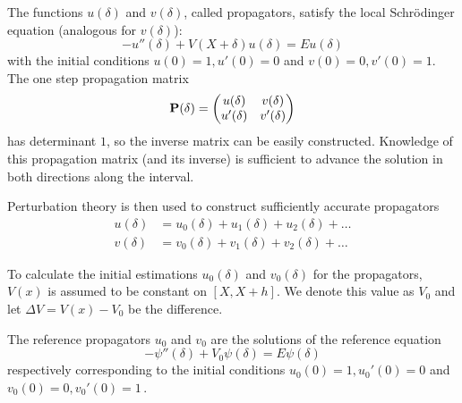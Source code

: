 The functions \(u(\delta)\) and \(v(\delta)\), called propagators,
satisfy the local Schrödinger equation (analogous for \(v(\delta)\)):
\begin{equation}
  - u''(\delta) + V(X+\delta) u(\delta) = E u(\delta) \label{eq:loc}
\end{equation}
with the initial conditions \(u(0) = 1, u'(0)=0\) and
\(v(0) = 0, v'(0)=1\). The one step propagation matrix \[
  \vb{P}(\delta) = \begin{pmatrix} u(\delta) & v(\delta) \\ u'(\delta) & v'(\delta) \end{pmatrix}
\] has determinant \(1\), so the inverse matrix can be easily
constructed. Knowledge of this propagation matrix (and its inverse) is sufficient to
advance the solution in both directions along the interval.

Perturbation theory is then used to construct sufficiently accurate propagators
\begin{align*}
  u(\delta) & = u_0(\delta) + u_1(\delta) + u_2(\delta) + \dots \\
  v(\delta) & = v_0(\delta) + v_1(\delta) + v_2(\delta) + \dots
\end{align*}


To calculate the initial estimations $u_0(\delta)$ and $v_0(\delta)$ for
the propagators, \(V(x)\) is assumed to be constant on \([X, X+h]\).
We denote this value as \(V_0\) and let \(\Delta V = V(x) - V_0\) be the difference.


The reference propagators \(u_0\) and \(v_0\) are the solutions of the reference equation
\[ -\psi''(\delta) + V_0 \psi(\delta) = E \psi(\delta) \]
respectively corresponding to the initial conditions
\(u_0(0) = 1, u_0'(0) = 0\) and
\(v_0(0) = 0, v_0'(0) = 1\,.\)
%

